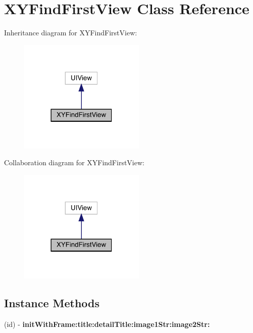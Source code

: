 \hypertarget{interface_x_y_find_first_view}{}\section{X\+Y\+Find\+First\+View Class Reference}
\label{interface_x_y_find_first_view}


Inheritance diagram for X\+Y\+Find\+First\+View\+:\nopagebreak
\begin{figure}[H]
\begin{center}
\leavevmode
\includegraphics[width=170pt]{interface_x_y_find_first_view__inherit__graph}
\end{center}
\end{figure}


Collaboration diagram for X\+Y\+Find\+First\+View\+:\nopagebreak
\begin{figure}[H]
\begin{center}
\leavevmode
\includegraphics[width=170pt]{interface_x_y_find_first_view__coll__graph}
\end{center}
\end{figure}
\subsection*{Instance Methods}
\begin{DoxyCompactItemize}
\item 
\mbox{\label{interface_x_y_find_first_view_afecdf40842ab5413a41be961f7d749ea}} 
(id) -\/ {\bfseries init\+With\+Frame\+:title\+:detail\+Title\+:image1\+Str\+:image2\+Str\+:}
\end{DoxyCompactItemize}

